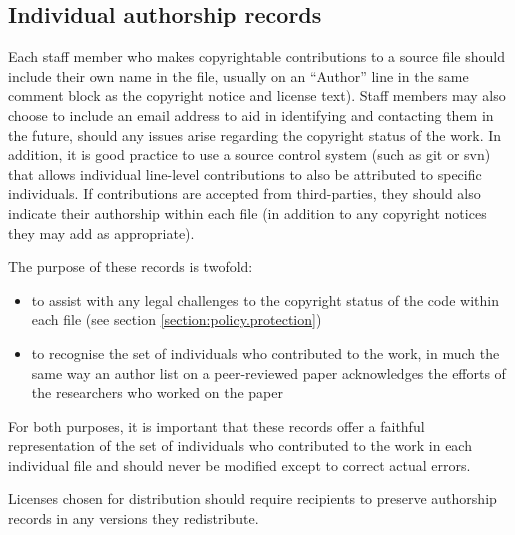 \documentclass[10pt,a4paper]{article}
\begin{document}


\subsection{Individual authorship records}
\label{section:impnotes.records}
\par Each staff member who makes copyrightable contributions to a source file 
should include their own name in the file, usually on an ``Author'' line in the 
same comment block as the copyright notice and license text). Staff members 
may also choose to include an email address to aid in identifying and contacting 
them in the future, should any issues arise regarding the copyright status of the 
work. In addition, it is good practice to use a source control system (such as git 
or svn) that allows individual line-level contributions to also be attributed to 
specific individuals. If contributions are accepted from third-parties, they 
should also indicate their authorship within each file (in addition to any 
copyright notices they may add as appropriate).

\par The purpose of these records is twofold: 
\begin{itemize}
\item to assist with any legal challenges to the copyright status of the code within 
each file (see section \ref{section:policy.protection})
\item to recognise the set of individuals who contributed to the work, in much the 
same way an author list on a peer-reviewed paper acknowledges the efforts of the 
researchers who worked on the paper
\end{itemize}

\par For both purposes, it is important that these records offer a faithful 
representation of the set of individuals who contributed to the work in each 
individual file and should never be modified except to correct actual errors. 

\par Licenses chosen for distribution should require  recipients to preserve
authorship records in any versions they redistribute. 


\end{document}
